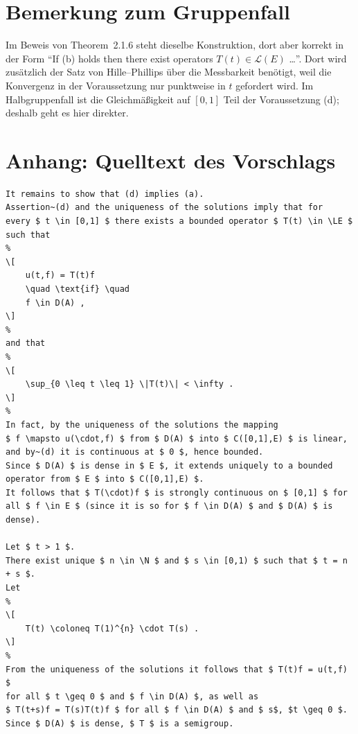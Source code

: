 \documentclass[11pt,a4paper]{article}
\newcommand{\LE}{\mathcal{L}(E)}
\newcommand{\N}{\mathbb{N}}
\providecommand{\coloneq}{\mathrel{\vcentcolon=}}
\begin{document}
\section*{Bemerkung zum Gruppenfall}

Im Beweis von Theorem~2.1.6 steht dieselbe Konstruktion, dort aber
korrekt in der Form \enquote{If (b) holds then there exist operators
$T(t) \in \mathcal{L}(E)$ \ldots}. Dort wird zusätzlich der Satz von
Hille--Phillips über die Messbarkeit benötigt, weil die Konvergenz in
der Voraussetzung nur punktweise in $t$ gefordert wird. Im
Halbgruppenfall ist die Gleichmäßigkeit auf $[0,1]$ Teil der
Voraussetzung (d); deshalb geht es hier direkter.

\appendix
\section*{Anhang: Quelltext des Vorschlags}

\small
\begin{verbatim}
It remains to show that (d) implies (a). 
Assertion~(d) and the uniqueness of the solutions imply that for 
every $ t \in [0,1] $ there exists a bounded operator $ T(t) \in \LE $ 
such that 
%
\[
	u(t,f) = T(t)f 
	\quad \text{if} \quad 
	f \in D(A) ,
\]
%
and that 
%
\[
	\sup_{0 \leq t \leq 1} \|T(t)\| < \infty .
\]
%
In fact, by the uniqueness of the solutions the mapping 
$ f \mapsto u(\cdot,f) $ from $ D(A) $ into $ C([0,1],E) $ is linear, 
and by~(d) it is continuous at $ 0 $, hence bounded. 
Since $ D(A) $ is dense in $ E $, it extends uniquely to a bounded 
operator from $ E $ into $ C([0,1],E) $.
It follows that $ T(\cdot)f $ is strongly continuous on $ [0,1] $ for 
all $ f \in E $ (since it is so for $ f \in D(A) $ and $ D(A) $ is dense).

Let $ t > 1 $.
There exist unique $ n \in \N $ and $ s \in [0,1) $ such that $ t = n + s $.
Let 
%
\[
	T(t) \coloneq T(1)^{n} \cdot T(s) .
\]
%
From the uniqueness of the solutions it follows that $ T(t)f = u(t,f) $ 
for all $ t \geq 0 $ and $ f \in D(A) $, as well as 
$ T(t+s)f = T(s)T(t)f $ for all $ f \in D(A) $ and $ s$, $t \geq 0 $.
Since $ D(A) $ is dense, $ T $ is a semigroup.
\end{verbatim}
\end{document}

